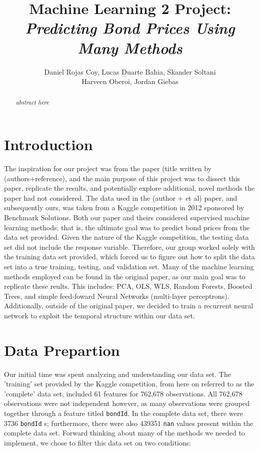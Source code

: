 \documentclass{article}
\author{Daniel Rojas Coy, Lucas Duarte Bahia, Skander Soltani\\ Harveen Oberoi, Jordan Giebas}
\newcommand{\code}[1]{\colorbox{light-gray}{\texttt{#1}}}
\begin{document}
\title{Machine Learning 2 Project:\\ \textit{Predicting Bond Prices Using Many Methods}}
\maketitle

\thispagestyle{empty}
\pagestyle{empty}


\begin{abstract}
\textit{abstract here}
\end{abstract}


\section{Introduction}

The inspiration for our project was from the paper (title written by (authors+reference), and the main purpose of this project was to dissect this paper, replicate the results, and potentially explore additional, novel methods the paper had not considered. The data used in the (author + et al) paper, and subsequently ours, was taken from a Kaggle competition in 2012 sponsored by Benchmark Solutions. Both our paper and theirs considered supervised machine learning methods; that is, the ultimate goal was to predict bond prices from the data set provided. Given the nature of the Kaggle competition, the testing data set did not include the response variable. Therefore, our group worked solely with the training data set provided, which forced us to figure out how to split the data set into a true training, testing, and validation set. Many of the machine learning methods employed can be found in the original paper, as our main goal was to replicate these reults. This includes: PCA, OLS, WLS, Random Forests, Boosted Trees, and simple feed-foward Neural Networks (multi-layer perceptrons). Additionally, outside of the original paper, we decided to train a recurrent neural network to exploit the temporal structure within our data set. 

\section{Data Prepartion}

Our initial time was spent analyzing and understanding our data set. The 'training' set provided by the Kaggle competition, from here on referred to as the 'complete' data set, included 61 features for 762,678 observations. All 762,678 observations were not independent however, as many observations were grouped together through a feature titled \code{bondId}. In the complete data set, there were 3736 \code{bondId} s; furthermore, there were also 439351 \code{nan} values present within the complete data set. Forward thinking about many of the methods we needed to implement, we chose to filter this data set on two conditions:
\end{document}
